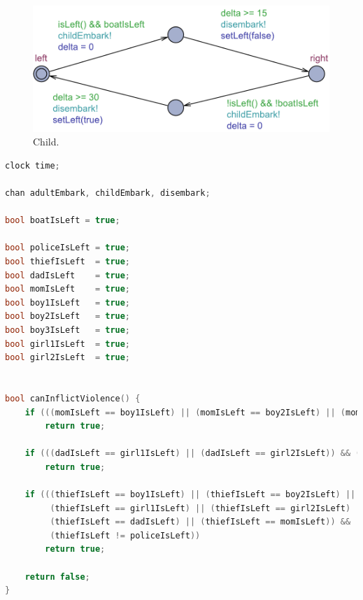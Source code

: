\documentclass[a4paper,12pt]{scrartcl}
\begin{document}
\begin{figure}[h]
\centering
\includegraphics[width=0.7\linewidth]{Child.pdf}
\caption{Child.}
\label{fig:child}
\end{figure}

\begin{lstlisting}[language=CPP, label = lst:plugin_example, caption = Global declarations with an extra boy.]
clock time;

chan adultEmbark, childEmbark, disembark;

bool boatIsLeft = true;

bool policeIsLeft = true;
bool thiefIsLeft  = true;
bool dadIsLeft    = true;
bool momIsLeft    = true;
bool boy1IsLeft   = true;
bool boy2IsLeft   = true;
bool boy3IsLeft   = true;
bool girl1IsLeft  = true;
bool girl2IsLeft  = true;


bool canInflictViolence() {
    if (((momIsLeft == boy1IsLeft) || (momIsLeft == boy2IsLeft) || (momIsLeft == boy3IsLeft)) && (momIsLeft != dadIsLeft))
        return true;

    if (((dadIsLeft == girl1IsLeft) || (dadIsLeft == girl2IsLeft)) && (dadIsLeft != momIsLeft))
        return true;

    if (((thiefIsLeft == boy1IsLeft) || (thiefIsLeft == boy2IsLeft) || (thiefIsLeft == boy3IsLeft) ||
         (thiefIsLeft == girl1IsLeft) || (thiefIsLeft == girl2IsLeft) || 
         (thiefIsLeft == dadIsLeft) || (thiefIsLeft == momIsLeft)) && 
         (thiefIsLeft != policeIsLeft))
        return true;

    return false;
}
\end{lstlisting}
\end{document}

